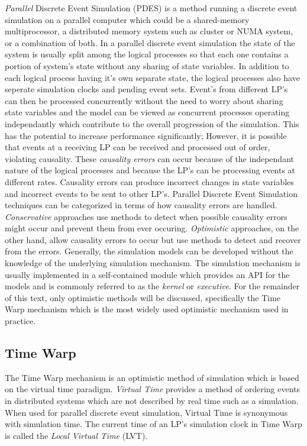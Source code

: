 \documentclass[11pt]{book}
\begin{document}
\emph{Parallel} Discrete Event Simulation (PDES) is a method running a discrete event
simulation on a parallel computer which could be a shared-memory multiprocessor, a distributed
memory system such as cluster or NUMA system, or a combination of both. In a parallel
discrete event simulation the state of the system is usually split among the logical
processes so that each one contains a portion of system's state without any sharing of
state variables\cite{fujimoto-90}. In addition to each logical process having it's own
separate state, the logical processes also have seperate simulation clocks and pending
event sets. Event's from different LP's can then be processed concurrently without the
need to worry about sharing state variables and the model can be viewed as concurrent
processes operating independantly which contribute to the overall progression of the
simulation. This has the potential to increase performance significantly; However, it is
possible that events at a receiving LP can be received and processed out of order, violating
causality. These \emph{causality errors} can occur because of the independant nature of the
logical processes and because the LP's can be processing events at different rates.
Causality errors can produce incorrect changes in state variables and incorrect events to
be sent to other LP's. Parallel Discrete Event Simulation techniques can be categorized in
terms of how causality errors are handled. \emph{Conservative} approaches use methods to
detect when possible causality errors might occur and prevent them from ever occuring.
\emph{Optimistic} approaches, on the other hand, allow causality errors to occur but use
methods to detect and recover from the errors. Generally, the simulation models can be
developed without the knowledge of the underlying simulation mechanism. The simulation
mechanism is usually implemented in a self-contained module which provides an API for the
models and is commonly referred to as the \emph{kernel} or \emph{executive}. For the remainder
of this text, only optimistic methods will be discussed, specifically the Time Warp mechanism
which is the most widely used optimistic mechanism used in practice.

\subsection{Time Warp}

The Time Warp mechanism is an optimistic method of simulation which is based on the virtual
time paradigm\cite{jefferson-85}. \emph{Virtual Time} provides a method of ordering events
in distributed systems which are not described by real time such as a simulation. When used
for parallel discrete event simulation, Virtual Time is synonymous with simulation time.
The current time of an LP's simulation clock in Time Warp is called the \emph{Local Virtual
Time} (LVT).
\end{document}
